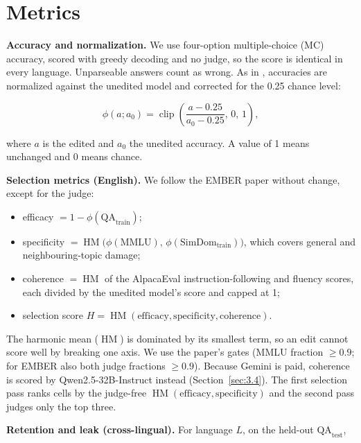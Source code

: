 \documentclass[11pt]{article}
\begin{document}
\section{Metrics}\label{sec:4}

\textbf{Accuracy and normalization.} We use four-option multiple-choice (MC) accuracy, scored with greedy decoding and no judge, so the score is identical in every language. Unparseable answers count as wrong. As in \citet{suslik2026ember}, accuracies are normalized against the unedited model and corrected for the 0.25 chance level:

\begin{equation*}
\phi(a;a_0)=\operatorname{clip}\!\left(\frac{a-0.25}{a_0-0.25},\,0,\,1\right),
\end{equation*}

where $a$ is the edited and $a_0$ the unedited accuracy. A value of 1 means unchanged and 0 means chance.

\textbf{Selection metrics (English).} We follow the EMBER paper without change, except for the judge:

\begin{itemize}
\setlength\itemsep{1pt}
\item efficacy $=1-\phi(\text{QA}_{\text{train}})$;
\item specificity $=\operatorname{HM}\big(\phi(\text{MMLU}),\,\phi(\text{SimDom}_{\text{train}})\big)$, which covers general and neighbouring-topic damage;
\item coherence $=\operatorname{HM}$ of the AlpacaEval instruction-following and fluency scores, each divided by the unedited model's score and capped at 1;
\item selection score $H=\operatorname{HM}(\text{efficacy},\text{specificity},\text{coherence})$.
\end{itemize}

The harmonic mean ($\operatorname{HM}$) is dominated by its smallest term, so an edit cannot score well by breaking one axis. We use the paper's gates (MMLU fraction $\ge 0.9$; for EMBER also both judge fractions $\ge 0.9$). Because Gemini is paid, coherence is scored by Qwen2.5-32B-Instruct instead (Section~\ref{sec:3.4}). The first selection pass ranks cells by the judge-free $\operatorname{HM}(\text{efficacy},\text{specificity})$ and the second pass judges only the top three.

\textbf{Retention and leak (cross-lingual).} For language $L$, on the held-out $\text{QA}_{\text{test}}$,
\end{document}
